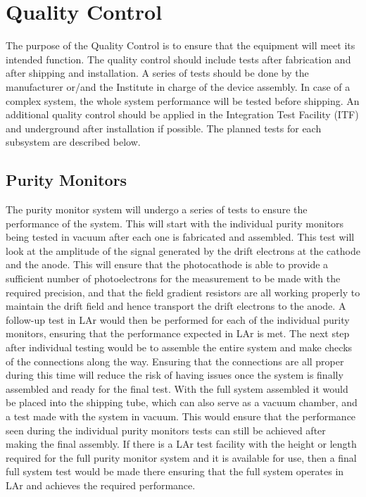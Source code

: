 \section{Quality Control}
\label{sec:fdgen-slow-cryo-qc}
The purpose of the Quality Control is to ensure that the equipment will meet its intended function. The quality control should include tests after fabrication and after shipping and installation. A series of tests should be done by the manufacturer or/and the Institute in charge of the device assembly. In case of a complex system, the whole system performance will be tested before shipping. 
An additional quality control should be applied in the Integration Test Facility (ITF) and underground after installation if possible. The planned tests for each subsystem are described below.  


\subsection{Purity Monitors}
\label{sec:fdgen-slow-cryo-qc-pm}

The purity monitor system will undergo a series of tests to ensure the performance of the system.  This will start with the individual purity monitors being tested in vacuum after each one is fabricated and assembled.  This test will look at the amplitude of the signal generated by the drift electrons at the cathode and the anode.  This will ensure that the photocathode is able to provide a sufficient number of photoelectrons for the measurement to be made with the required precision, and that the field gradient resistors are all working properly to maintain the drift field and hence transport the drift electrons to the anode.  A follow-up test in LAr would then be performed for each of the individual purity monitors, ensuring that the performance expected in LAr is met.  The next step after individual testing would be to assemble the entire system and make checks of the connections along the way.  Ensuring that the connections are all proper during this time will reduce the risk of having issues once the system is finally assembled and ready for the final test.  With the full system assembled it would be placed into the shipping tube, which can also serve as a vacuum chamber, and a test made with the system in vacuum.  This would ensure that the performance seen during the individual purity monitors tests can still be achieved after making the final assembly.  If there is a LAr test facility with the height or length required for the full purity monitor system and it is available for use, then a final full system test would be made there ensuring that the full system operates in LAr and achieves the required performance.

